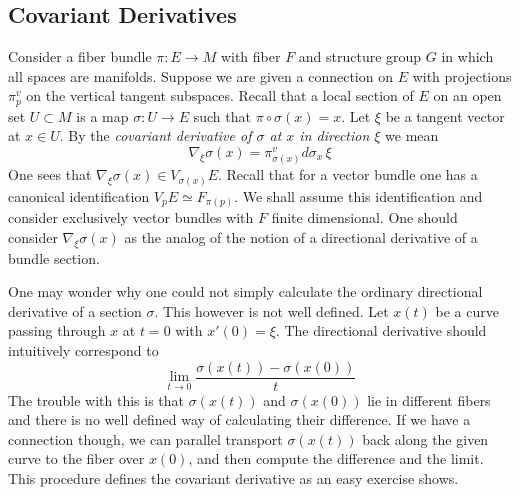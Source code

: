 \documentclass[12pt,titlepage]{article}
\begin{document}
\subsection{Covariant Derivatives}\label{sec:covdev}%
Consider a fiber bundle  \(\pi:E \to M\) with fiber \(F\) and
structure group \(G\) in which all spaces are manifolds.  Suppose we are
given a connection on \(E\) with projections \(\pi^v_p\) on the vertical
tangent subspaces. Recall that a local section of \(E\) on an open set
\(U\subset M\) is a map \(\sigma: U \to E\) such that
\(\pi\circ\sigma(x) = x\). Let \(\xi\) be a tangent vector at \(x\in
U\). By the   {\em covariant derivative
%
 of \(\sigma\) at \(x\) in
direction \(\xi\)\/} we mean
\[%
\nabla_\xi \sigma(x) = \pi^v_{\sigma(x)} d\sigma_x \,\xi
\]%
One sees that \(\nabla_\xi\sigma(x) \in V_{\sigma(x)}E\).
Recall that for a vector bundle one has a canonical identification
\(V_pE \simeq F_{\pi(p)}\). We shall assume this identification and
consider exclusively vector bundles with \(F\) finite dimensional.
One should consider \(\nabla_\xi \sigma(x)\) as the analog of the notion
of a directional derivative of a bundle section.

One may wonder why one could not simply calculate the ordinary 
directional derivative of a section \(\sigma\). This however is not well
defined. Let \(x(t)\) be a curve
passing through \(x\) at \(t=0\) with \(x'(0)=\xi\). The directional
derivative should intuitively correspond to 
\[
\lim_{t\to 0} \frac{\sigma(x(t))-\sigma(x(0))}{t}
\]
The trouble with this is that \(\sigma(x(t))\) and \(\sigma(x(0))\) lie
in different fibers and there is no well defined way of calculating
their difference. If we have a connection though, we can parallel
transport \(\sigma(x(t))\) back along the given curve to the fiber over
\(x(0)\), and then compute the difference and  the limit. 
This procedure defines the
covariant derivative as an easy exercise shows. 
\end{document}

